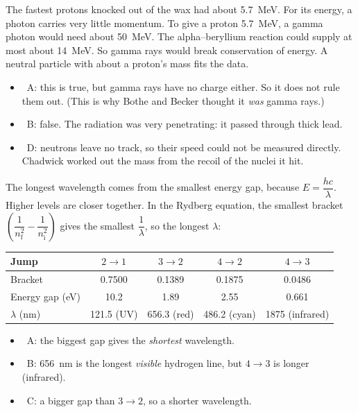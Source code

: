 \begin{practiceanswers}
\begin{practiceans}
  The fastest protons knocked out of the wax had about \qty{5.7}{MeV}. For its energy, a
  photon carries very little momentum. To give a proton \qty{5.7}{MeV}, a gamma photon would
  need about \qty{50}{MeV}. The alpha--beryllium reaction could supply at most about
  \qty{14}{MeV}. So gamma rays would break conservation of energy. A neutral particle with
  about a proton's mass fits the data.
  \begin{itemize}
    \item \xmark\ A: this is true, but gamma rays have no charge either. So it does not rule
          them out. (This is why Bothe and Becker thought it \emph{was} gamma rays.)
    \item \xmark\ B: false. The radiation was very penetrating: it passed through thick lead.
    \item \xmark\ D: neutrons leave no track, so their speed could not be measured directly.
          Chadwick worked out the mass from the recoil of the nuclei it hit.
  \end{itemize}
\end{practiceans}

\begin{practiceans}
  The longest wavelength comes from the smallest energy gap, because $E = \dfrac{hc}{\lambda}$.
  Higher levels are closer together. In the Rydberg equation, the smallest bracket
  $\left(\dfrac{1}{n_\mathrm{f}^2} - \dfrac{1}{n_\mathrm{i}^2}\right)$ gives the smallest
  $\dfrac{1}{\lambda}$, so the longest $\lambda$:
  \begin{center}\small
  \begin{tabular}{@{}lcccc@{}}
    \toprule
    Jump & $2 \to 1$ & $3 \to 2$ & $4 \to 2$ & $4 \to 3$\\
    \midrule
    Bracket & 0.7500 & 0.1389 & 0.1875 & 0.0486\\
    Energy gap (\si{eV}) & 10.2 & 1.89 & 2.55 & 0.661\\
    $\lambda$ (\si{nm}) & 121.5 (UV) & 656.3 (red) & 486.2 (cyan) & 1875 (infrared)\\
    \bottomrule
  \end{tabular}
  \end{center}
  \begin{itemize}
    \item \xmark\ A: the biggest gap gives the \emph{shortest} wavelength.
    \item \xmark\ B: \qty{656}{nm} is the longest \emph{visible} hydrogen line, but $4 \to 3$
          is longer (infrared).
    \item \xmark\ C: a bigger gap than $3 \to 2$, so a shorter wavelength.
  \end{itemize}
\end{practiceans}


\end{practiceanswers}
